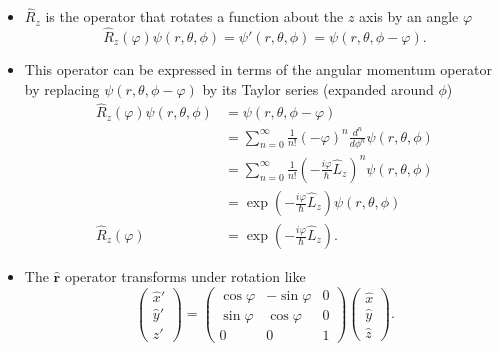 \documentclass{article}
\renewcommand{\vec}[1]{\boldsymbol{\mathbf{#1}}}
\newcommand{\uvec}[1]{\hat{\vec{#1}}}
\begin{document}
\begin{itemize}
  \item $\hat{R}_z$ is the operator that rotates a function about the $z$ axis by an angle $\varphi$ \[\hat{R}_z(\varphi) \psi(r, \theta, \phi) = \psi'(r, \theta, \phi) = \psi(r, \theta, \phi - \varphi).\]

  \item This operator can be expressed in terms of the angular momentum operator by replacing $\psi(r, \theta, \phi - \varphi)$ by its Taylor series (expanded around $\phi$) \begin{align*}
          \hat{R}_z(\varphi) \psi(r, \theta, \phi) & = \psi(r, \theta, \phi - \varphi)                                                                            \\
                                                   & = \sum_{n = 0}^\infty \frac{1}{n!} (-\varphi)^n \frac{d^n}{d \phi^n} \psi(r, \theta, \phi)                   \\
                                                   & = \sum_{n = 0}^\infty \frac{1}{n!} \left( -\frac{i \varphi}{\hbar} \hat{L}_z \right)^n \psi(r, \theta, \phi) \\
                                                   & = \exp \left( -\frac{i \varphi}{\hbar} \hat{L}_z \right) \psi(r, \theta, \phi)                               \\
          \hat{R}_z(\varphi)                       & = \exp \left( -\frac{i \varphi}{\hbar} \hat{L}_z \right).
        \end{align*}

  \item The $\uvec{r}$ operator transforms under rotation like \[\begin{pmatrix}
            \hat{x}' \\
            \hat{y}' \\
            \hat{z}'
          \end{pmatrix} = \begin{pmatrix}
            \cos \varphi & -\sin \varphi & 0 \\
            \sin \varphi & \cos \varphi  & 0 \\
            0            & 0             & 1
          \end{pmatrix} \begin{pmatrix}
            \hat{x} \\
            \hat{y} \\
            \hat{z}
          \end{pmatrix}.\]
\end{itemize}
\end{document}
